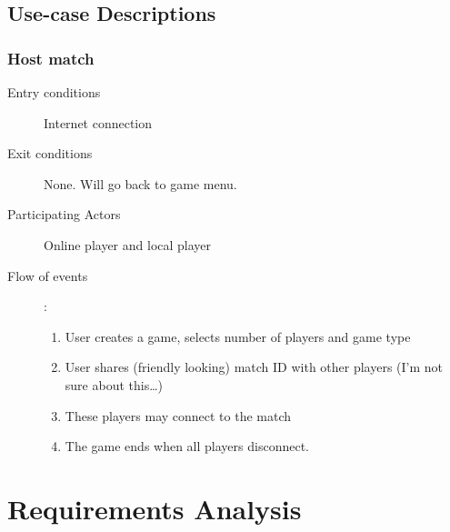 \documentclass[12pt]{article}
\begin{document}
\subsection{Use-case Descriptions}
\begin{mdframed}
    \subsubsection{Host match}
    \begin{description}
        \item[Entry conditions] Internet connection
        \item[Exit conditions] None. Will go back to game menu.
        \item[Participating Actors] Online player and local player
        \item[Flow of events]:
            \begin{enumerate}
                \item User creates a game, selects number of players and game
                    type
                \item User shares (friendly looking) match ID with other
                    players (I’m not sure about this…)
                \item These players may connect to the match
                \item The game ends when all players disconnect.
            \end{enumerate}
    \end{description}
\end{mdframed}




\section{Requirements Analysis}
\end{document}
